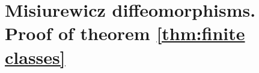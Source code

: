 \documentclass[a4paper,11pt]{article}
\theoremstyle{definition}
\def\DD{{\mathbb D}}
\def\La{\Lambda}
\def\la{\lambda}
\def\La{\Lambda}
\def\noi{\noindent}
\begin{document}


 
 
 





\section{Misiurewicz diffeomorphisms.  Proof of theorem \ref{thm:finite classes}}\label{sec:misiu}


\end{document}
